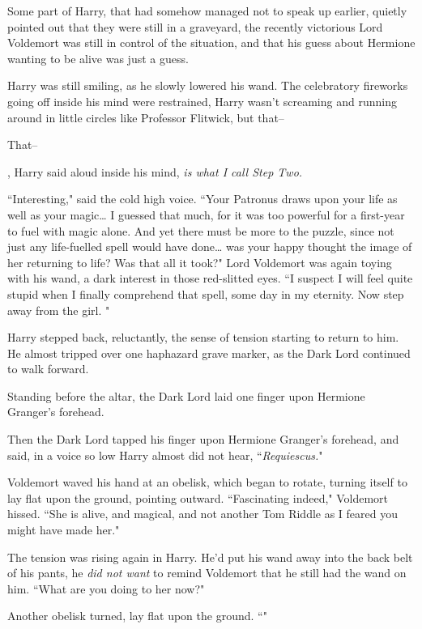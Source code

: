Some part of Harry, that had somehow managed not to speak up earlier, quietly pointed out that they were still in a graveyard, the recently victorious Lord Voldemort was still in control of the situation, and that his guess about Hermione wanting to be alive was just a guess.

Harry was still smiling, as he slowly lowered his wand. The celebratory fireworks going off inside his mind were restrained, Harry wasn't screaming and running around in little circles like Professor Flitwick, but that\---

That\---

\emph{}, Harry said aloud inside his mind, \emph{ is what I call Step Two.}

``Interesting," said the cold high voice. ``Your Patronus draws upon your life as well as your magic{\ldots} I guessed that much, for it was too powerful for a first-year to fuel with magic alone. And yet there must be more to the puzzle, since not just any life-fuelled spell would have done{\ldots} was your happy thought the image of her returning to life? Was that all it took?" Lord Voldemort was again toying with his wand, a dark interest in those red-slitted eyes. ``I suspect I will feel quite stupid when I finally comprehend that spell, some day in my eternity. Now step away from the girl. "

Harry stepped back, reluctantly, the sense of tension starting to return to him. He almost tripped over one haphazard grave marker, as the Dark Lord continued to walk forward.

Standing before the altar, the Dark Lord laid one finger upon Hermione Granger's forehead.

Then the Dark Lord tapped his finger upon Hermione Granger's forehead, and said, in a voice so low Harry almost did not hear, ``\emph{Requiescus.}"

Voldemort waved his hand at an obelisk, which began to rotate, turning itself to lay flat upon the ground, pointing outward. ``Fascinating indeed," Voldemort hissed. ``She is alive, and magical, and not another Tom Riddle as I feared you might have made her."

The tension was rising again in Harry. He'd put his wand away into the back belt of his pants, he \emph{did not want} to remind Voldemort that he still had the wand on him. ``What are you doing to her now?"

Another obelisk turned, lay flat upon the ground. ``"

